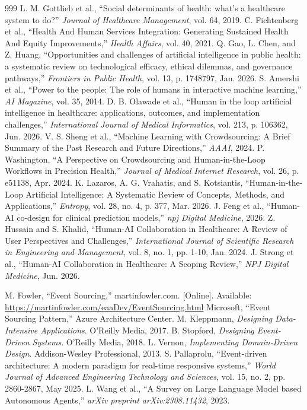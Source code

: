 \documentclass[12pt,oneside]{report}
\begin{document}
\begin{thebibliography}{999}
 L. M. Gottlieb et al., ``Social determinants of health: what's a healthcare system to do?'' \textit{Journal of Healthcare Management}, vol. 64, 2019.
 C. Fichtenberg et al., ``Health And Human Services Integration: Generating Sustained Health And Equity Improvements,'' \textit{Health Affairs}, vol. 40, 2021.
 Q. Gao, L. Chen, and Z. Huang, ``Opportunities and challenges of artificial intelligence in public health: a systematic review on technological efficacy, ethical dilemmas, and governance pathways,'' \textit{Frontiers in Public Health}, vol. 13, p. 1748797, Jan. 2026.
 S. Amershi et al., ``Power to the people: The role of humans in interactive machine learning,'' \textit{AI Magazine}, vol. 35, 2014.
 D. B. Olawade et al., ``Human in the loop artificial intelligence in healthcare: applications, outcomes, and implementation challenges,'' \textit{International Journal of Medical Informatics}, vol. 213, p. 106362, Jun. 2026.
 V. S. Sheng et al., ``Machine Learning with Crowdsourcing: A Brief Summary of the Past Research and Future Directions,'' \textit{AAAI}, 2024.
 P. Washington, ``A Perspective on Crowdsourcing and Human-in-the-Loop Workflows in Precision Health,'' \textit{Journal of Medical Internet Research}, vol. 26, p. e51138, Apr. 2024.
 K. Lazaros, A. G. Vrahatis, and S. Kotsiantis, ``Human-in-the-Loop Artificial Intelligence: A Systematic Review of Concepts, Methods, and Applications,'' \textit{Entropy}, vol. 28, no. 4, p. 377, Mar. 2026.
 J. Feng et al., ``Human-AI co-design for clinical prediction models,'' \textit{npj Digital Medicine}, 2026.
 Z. Hussain and S. Khalid, ``Human-AI Collaboration in Healthcare: A Review of User Perspectives and Challenges,'' \textit{International Journal of Scientific Research in Engineering and Management}, vol. 8, no. 1, pp. 1-10, Jan. 2024.
 J. Strong et al., ``Human-AI Collaboration in Healthcare: A Scoping Review,'' \textit{NPJ Digital Medicine}, Jun. 2026.

 M. Fowler, ``Event Sourcing,'' martinfowler.com. [Online]. Available: \url{https://martinfowler.com/eaaDev/EventSourcing.html}
 Microsoft, ``Event Sourcing Pattern,'' Azure Architecture Center.
 M. Kleppmann, \textit{Designing Data-Intensive Applications}. O'Reilly Media, 2017.
 B. Stopford, \textit{Designing Event-Driven Systems}. O'Reilly Media, 2018.
 L. Vernon, \textit{Implementing Domain-Driven Design}. Addison-Wesley Professional, 2013.
 S. Pallaprolu, ``Event-driven architecture: A modern paradigm for real-time responsive systems,'' \textit{World Journal of Advanced Engineering Technology and Sciences}, vol. 15, no. 2, pp. 2860-2867, May 2025.
 L. Wang et al., ``A Survey on Large Language Model based Autonomous Agents,'' \textit{arXiv preprint arXiv:2308.11432}, 2023.


\end{thebibliography}
\end{document}
